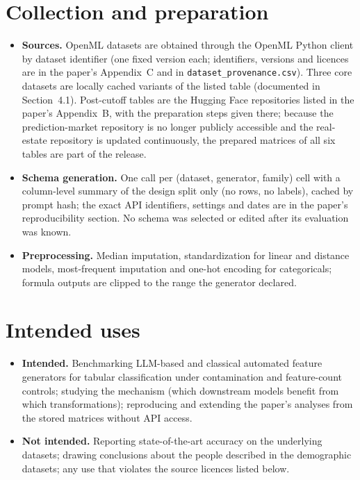 \documentclass[11pt]{article}
\begin{document}
\section*{Collection and preparation}
\begin{itemize}
\item \textbf{Sources.} OpenML datasets are obtained through the OpenML Python client by dataset identifier (one fixed version each; identifiers, versions and licences are in the paper's Appendix~C and in \texttt{dataset\_provenance.csv}). Three core datasets are locally cached variants of the listed table (documented in Section~4.1). Post-cutoff tables are the Hugging Face repositories listed in the paper's Appendix~B, with the preparation steps given there; because the prediction-market repository is no longer publicly accessible and the real-estate repository is updated continuously, the prepared matrices of all six tables are part of the release.
\item \textbf{Schema generation.} One call per (dataset, generator, family) cell with a column-level summary of the design split only (no rows, no labels), cached by prompt hash; the exact API identifiers, settings and dates are in the paper's reproducibility section. No schema was selected or edited after its evaluation was known.
\item \textbf{Preprocessing.} Median imputation, standardization for linear and distance models, most-frequent imputation and one-hot encoding for categoricals; formula outputs are clipped to the range the generator declared.
\end{itemize}

\section*{Intended uses}
\begin{itemize}
\item \textbf{Intended.} Benchmarking LLM-based and classical automated feature generators for tabular classification under contamination and feature-count controls; studying the mechanism (which downstream models benefit from which transformations); reproducing and extending the paper's analyses from the stored matrices without API access.
\item \textbf{Not intended.} Reporting state-of-the-art accuracy on the underlying datasets; drawing conclusions about the people described in the demographic datasets; any use that violates the source licences listed below.
\end{itemize}
\end{document}
